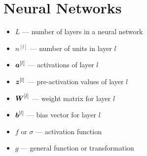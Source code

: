 \section*{Neural Networks}

\begin{itemize}[leftmargin=2em]
    \item $L$ --- number of layers in a neural network
    \item $n^{[l]}$ --- number of units in layer $l$
    \item $\boldsymbol{a}^{[l]}$ --- activations of layer $l$
    \item $\boldsymbol{z}^{[l]}$ --- pre-activation values of layer $l$
    \item $\boldsymbol{W}^{[l]}$ --- weight matrix for layer $l$
    \item $\boldsymbol{b}^{[l]}$ --- bias vector for layer $l$
    \item $f$ or $\sigma$ --- activation function
    \item $g$ --- general function or transformation
\end{itemize}
